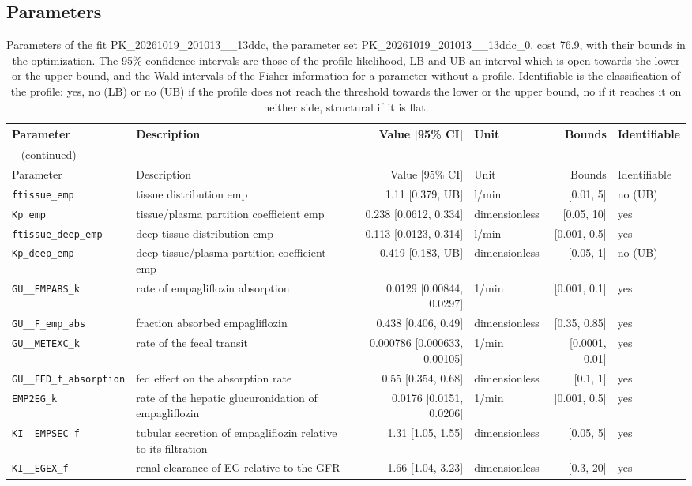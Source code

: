 \documentclass{article}
\begin{document}
\subsection{Parameters}

\begin{longtable}{llrlrl}
\caption{Parameters of the fit PK\_20261019\_201013\_\_13ddc, the parameter set PK\_20261019\_201013\_\_13ddc\_0, cost 76.9, with their bounds in the optimization. The 95\% confidence intervals are those of the profile likelihood, LB and UB an interval which is open towards the lower or the upper bound, and the Wald intervals of the Fisher information for a parameter without a profile. Identifiable is the classification of the profile: yes, no (LB) or no (UB) if the profile does not reach the threshold towards the lower or the upper bound, no if it reaches it on neither side, structural if it is flat.}\label{tab:parameters:PK_20261019_201013__13ddc} \\
\toprule
Parameter & Description & Value [95\% CI] & Unit & Bounds & Identifiable \\
\midrule
\endfirsthead
\multicolumn{6}{l}{\small\tablename~\thetable{} (continued)} \\
\toprule
Parameter & Description & Value [95\% CI] & Unit & Bounds & Identifiable \\
\midrule
\endhead
\bottomrule
\endlastfoot
\texttt{ftissue\_emp} & tissue distribution emp & 1.11 [0.379, UB] & l/min & [0.01, 5] & no (UB) \\
\texttt{Kp\_emp} & tissue/plasma partition coefficient emp & 0.238 [0.0612, 0.334] & dimensionless & [0.05, 10] & yes \\
\texttt{ftissue\_deep\_emp} & deep tissue distribution emp & 0.113 [0.0123, 0.314] & l/min & [0.001, 0.5] & yes \\
\texttt{Kp\_deep\_emp} & deep tissue/plasma partition coefficient emp & 0.419 [0.183, UB] & dimensionless & [0.05, 1] & no (UB) \\
\texttt{GU\_\_EMPABS\_k} & rate of empagliflozin absorption & 0.0129 [0.00844, 0.0297] & 1/min & [0.001, 0.1] & yes \\
\texttt{GU\_\_F\_emp\_abs} & fraction absorbed empagliflozin & 0.438 [0.406, 0.49] & dimensionless & [0.35, 0.85] & yes \\
\texttt{GU\_\_METEXC\_k} & rate of the fecal transit & 0.000786 [0.000633, 0.00105] & 1/min & [0.0001, 0.01] & yes \\
\texttt{GU\_\_FED\_f\_absorption} & fed effect on the absorption rate & 0.55 [0.354, 0.68] & dimensionless & [0.1, 1] & yes \\
\texttt{EMP2EG\_k} & rate of the hepatic glucuronidation of empagliflozin & 0.0176 [0.0151, 0.0206] & 1/min & [0.001, 0.5] & yes \\
\texttt{KI\_\_EMPSEC\_f} & tubular secretion of empagliflozin relative to its filtration & 1.31 [1.05, 1.55] & dimensionless & [0.05, 5] & yes \\
\texttt{KI\_\_EGEX\_f} & renal clearance of EG relative to the GFR & 1.66 [1.04, 3.23] & dimensionless & [0.3, 20] & yes \\
\end{longtable}
\end{document}
